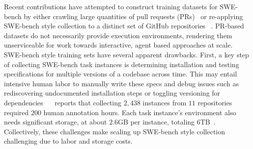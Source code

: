 Recent contributions have attempted to construct training datasets for SWE-bench by either crawling large quantities of pull requests (PRs)~\citep{jimenez_swe-bench_2024,wei2025swerladvancingllmreasoning,xie2025swefixertrainingopensourcellms} or re-applying SWE-bench style collection to a distinct set of GitHub repositories~\citep{badertdinov2024scaling,pan_training_2024} .
PR-based datasets do not necessarily provide execution environments, rendering them unserviceable for work towards interactive, agent based approaches at scale.
SWE-bench style training sets have several apparent drawbacks.
First, a key step of collecting SWE-bench task instances is determining installation and testing specifications for multiple versions of a codebase across time. 
This may entail intensive human labor to manually write these specs and debug issues such as rediscovering undocumented installation steps or toggling versioning for dependencies~\citep{yang_swe-bench_2024} 
~\cite{pan_training_2024} reports that collecting $2,438$ instances from $11$ repositories required $200$ human annotation hours.
Each task instance's environment also needs significant storage, at about $2.6$GB per instance, totaling $6$TB~\citep{pan_training_2024}.
Collectively, these challenges make scaling up SWE-bench style collection challenging due to labor and storage costs.

